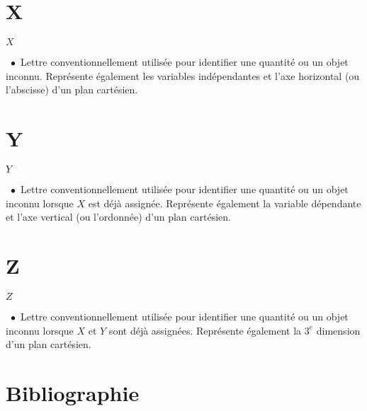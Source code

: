 \documentclass[10.5pt,a4paper]{article}
\renewcommand{\footnotesize}{\scriptsize}
\newcommand{\entry}[3]{\normalsize{\textbf{#1}}\markboth{#1}{#1}\ $\bullet$\ \footnotesize{#2}\ \footnotesize{#3}} %
\begin{document}
\begin{multicols}{2}
\section*{X}

\entry{$X$}{Lettre conventionnellement utilisée pour identifier une quantité ou un objet inconnu. Représente également les variables indépendantes et l'axe horizontal (ou l'abscisse) d'un plan cartésien.}{}

\section*{Y}

\entry{$Y$}{Lettre conventionnellement utilisée pour identifier une quantité ou un objet inconnu lorsque $X$ est déjà assignée. Représente également la variable dépendante et l'axe vertical (ou l'ordonnée) d'un plan cartésien.}{}

\section*{Z}

\entry{$Z$}{Lettre conventionnellement utilisée pour identifier une quantité ou un objet inconnu lorsque $X$ et $Y$ sont déjà assignées. Représente également la $3^{e}$ dimension d'un plan cartésien.}{}

\end{multicols}

\pagebreak

\section{Bibliographie}
\begingroup
\renewcommand{\section}[2]{}


\vspace{10cm}
\endgroup
\end{document}
